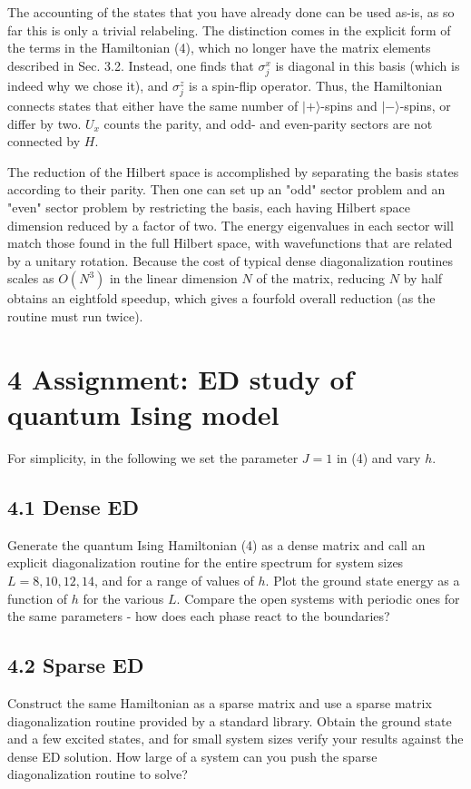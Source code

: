 \documentclass[12pt]{article}
\begin{document}
The accounting of the states that you have already done can be used as-is, as so far this is only a trivial relabeling. The distinction comes in the explicit form of the terms in the Hamiltonian (4), which no longer have the matrix elements described in Sec. 3.2. Instead, one finds that $\sigma_{j}^{x}$ is diagonal in this basis (which is indeed why we chose it), and $\sigma_{j}^{z}$ is a spin-flip operator. Thus, the Hamiltonian connects states that either have the same number of $|+\rangle$-spins and $|-\rangle$-spins, or differ by two. $U_{x}$ counts the parity, and odd- and even-parity sectors are not connected by $H$.

The reduction of the Hilbert space is accomplished by separating the basis states according to their parity. Then one can set up an "odd" sector problem and an "even" sector problem by restricting the basis, each having Hilbert space dimension reduced by a factor of two. The energy eigenvalues in each sector will match those found in the full Hilbert space, with wavefunctions that are related by a unitary rotation. Because the cost of typical dense diagonalization routines scales as $O\left(N^{3}\right)$ in the linear dimension $N$ of the matrix, reducing $N$ by half obtains an eightfold speedup, which gives a fourfold overall reduction (as the routine must run twice).

\section*{4 Assignment: ED study of quantum Ising model}
For simplicity, in the following we set the parameter $J=1$ in (4) and vary $h$.

\subsection*{4.1 Dense ED}
Generate the quantum Ising Hamiltonian (4) as a dense matrix and call an explicit diagonalization routine for the entire spectrum for system sizes $L=8,10,12,14$, and for a range of values of $h$. Plot the ground state energy as a function of $h$ for the various $L$. Compare the open systems with periodic ones for the same parameters - how does each phase react to the boundaries?

\subsection*{4.2 Sparse ED}
Construct the same Hamiltonian as a sparse matrix and use a sparse matrix diagonalization routine provided by a standard library. Obtain the ground state and a few excited states, and for small system sizes verify your results against the dense ED solution. How large of a system can you push the sparse diagonalization routine to solve?
\end{document}
